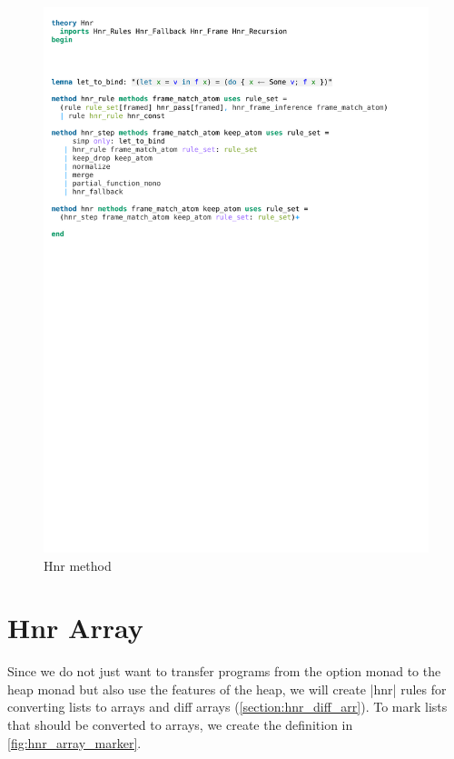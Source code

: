 \begin{figure}[htpb]
    \includegraphics[trim={0 18cm 0 10,8cm}, clip, width=1.00\textwidth]{figures/Theory_Hnr.pdf}
    \caption[Hnr method]{Hnr method}
    \label{fig:hnr_method}
\end{figure}

\section{Hnr Array}\label{section:hnr_arr}

Since we do not just want to transfer programs from the option monad to the heap monad but also use the features of the heap, we will create |hnr| rules for converting lists to arrays and diff arrays (\autoref{section:hnr_diff_arr}). 
To mark lists that should be converted to arrays, we create the definition in \autoref{fig:hnr_array_marker}.

